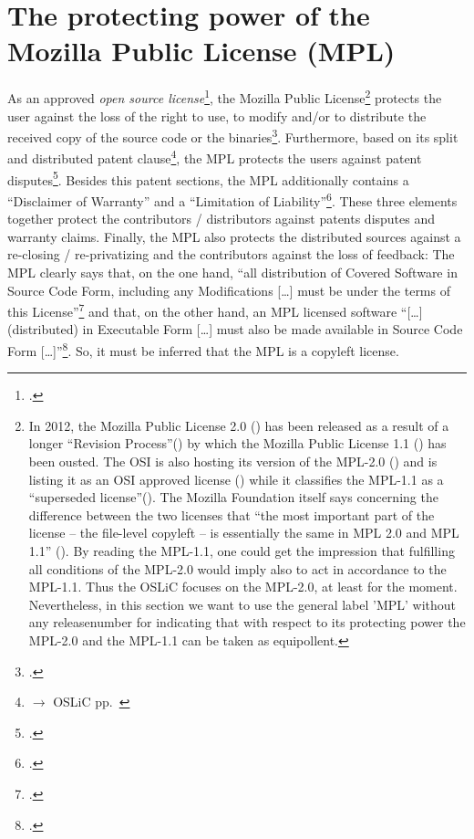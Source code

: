 \section{The protecting power of the Mozilla Public License (MPL)}
 \label{sec:ProtectingPowerOfMpl}
 
As an approved \emph{open source license}\footcite[cf.][\nopage wp]{OSI2012b},
the Mozilla Public License\footnote{In 2012, the Mozilla Public License 2.0
(\cite[cf.][\nopage wp]{Mpl20MozFoundation2012a}) has been released as a result
of a longer \enquote{Revision Process}(\cite[cf.][\nopage
wp]{Mpl11To20MozFoundation2013a}) by which the  Mozilla Public License 1.1
(\cite[cf.][\nopage wp]{Mpl11MozFoundation2013a}) has been ousted. The OSI is
also hosting its version of the MPL-2.0 (\cite[cf.][\nopage
wp]{Mpl20OsiLicense2013a}) and is listing it as an OSI approved license
(\cite[cf.][\nopage wp]{OSI2012b}) while it classifies the MPL-1.1 as a
\enquote{superseded license}(\cite[cf.][\nopage wp]{OSI2013b}). The Mozilla
Foundation itself says concerning the difference between the two licenses that
\enquote{the most important part of the license -- the file-level copyleft -- is
essentially the same in MPL 2.0 and MPL 1.1} (\cite[cf.][\nopage
wp]{Mpl11To20MozFoundation2013a}). By reading the MPL-1.1, one could get the
impression that fulfilling all conditions of the MPL-2.0 would imply also to act
in accordance to the MPL-1.1. Thus the OSLiC focuses on the MPL-2.0, at least
for the moment. Nevertheless, in this section we want to use the general label
'MPL' without any releasenumber for indicating that with respect to its
protecting power the MPL-2.0 and the MPL-1.1 can be taken as equipollent.}
protects the user against the loss of the right to use, to modify and/or to
distribute the received copy of the source code or the
binaries\footcite[cf.][\nopage wp.\ §2.1.a]{Mpl20OsiLicense2013a}.
Furthermore, based on its split and distributed patent
clause\footnote{$\rightarrow$ OSLiC pp.\ \pageref{subsec:MplPatentClause}}, the
MPL protects the users against patent disputes\footcite[cf.][\nopage wp.\
§2.1.b, §2.3, §5.2]{Mpl20OsiLicense2013a}. Besides this patent sections, the MPL
additionally contains a \enquote{Disclaimer of Warranty} and a
\enquote{Limitation of Liability}\footcite[cf.][\nopage wp.\ §6 \&
§7]{Mpl20OsiLicense2013a}. These three elements together protect the
contributors / distributors against patents disputes and warranty claims.
Finally, the MPL also protects the distributed sources against a re-closing /
re-privatizing and the contributors against the loss of feedback: The MPL
clearly says that, on the one hand, \enquote{all distribution of Covered
Software in Source Code Form, including any Modifications [\ldots] must be under
the terms of this License}\footcite[cf.][\nopage wp.\
§3.1]{Mpl20OsiLicense2013a} and that, on the other hand, an MPL licensed
software \enquote{[\ldots] (distributed) in Executable Form [\ldots] must also
be made available in Source Code Form [\ldots]}\footcite[cf.][\nopage wp.\
§3.2]{Mpl20OsiLicense2013a}. So, it must be inferred that the MPL is a copyleft
license.

